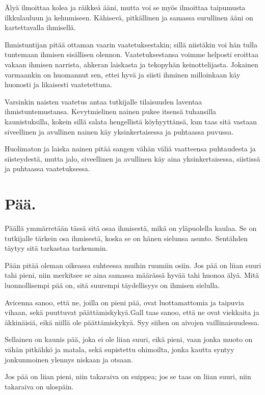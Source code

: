 \documentclass[11pt, twoside, finnish, a5paper]{book}
\begin{document}
Älyä ilmoittaa kolea ja räikkeä ääni, mutta voi se
myös ilmoittaa taipumusta ilkkulauluun ja kehumiseen.
Kähisevä, pitkällinen ja samassa surullinen
ääni on kartettavalla ihmisellä.

Ihmistuntijan pitää ottaman vaarin vaatetuksestakin;
sillä niistäkin voi hän tulla tuntemaan ihmisen sisällisen
olennon. Vaatetuksestansa voimme helposti eroittaa
vakaan ihmisen narrista, ahkeran laiskasta ja tekopyhän
keinottelijasta. Jokainen varmaankin on huomannut sen,
ettei hyvä ja siisti ihminen milloinkaan käy huonosti ja
likaisesti vaatetettuna.
 
Varsinkin naisten vaatetus antaa tutkijalle tilaisuuden
laventaa ihmistuntemustansa. Kevytmielinen nainen
pukee itsensä tuhansilla kaunistuksilla, kokein sillä salata
hengellistä köyhyyttänsä, kun taas sitä vastaan siveellinen
ja avullinen nainen käy yksinkertaisessa ja puhtaassa puvussa.
 
Huolimaton ja laiska nainen pitää sangen vähän väliä
vaatteensa puhtaudesta ja siisteydestä, mutta jalo, 
siveellinen ja avullinen käy aina yksinkertaisessa,
siistissä ja puhtaassa vaatetuksessa.

\chapter*{Pää.}

Päällä ymmärretään tässä sitä osaa ihmisestä,
mikä on yläpuolella  kaulaa. Se on tutkijalle
tärkein osa ihmisestä, koska se on hänen
sielunsa asunto. Sentähden täytyy sitä
tarkastaa tarkemmin.

Pään pitää oleman oikeassa suhteessa muihin ruumiin
osiin. Jos pää on liian suuri tahi pieni, niin merkitsee
se aina samassa määrässä hyvää tahi huonoa älyä.
Mitä luonnollisempi pää on, sitä suurempi täydellisyys
on ihmisen sielulla.

Avicenna sanoo, että ne, joilla on pieni pää, ovat
luottamattomia ja taipuvia vihaan, sekä puuttuvat
päättämiskykyä.Gall taas sanoo, että ne ovat viekkaita
ja äkkinäisiä, eikä niillä ole päättämiskykyä. Syy siihen
on aivojen vaillinaisuudessa.

Sellainen on kaunis pää, joka ei ole liian suuri, eikä
pieni, vaan jonka muoto on vähän pitkähkö ja matala,
sekä supistettu ohimoilta, jonka kautta syntyy
jonkunmoinen ylennys niskaan ja otsaan.

Jos pää on liian pieni, niin takaraiva on suippea; jos
se taas on liian suuri, niin takaraiva on ulospäin.
\end{document}
